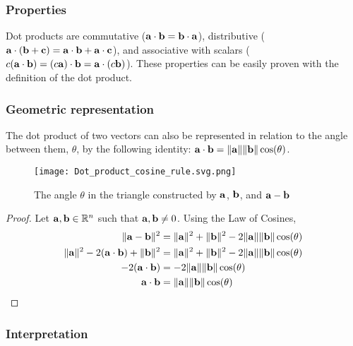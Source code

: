 \documentclass[../main.tex]{subfiles}
\begin{document}
\subsubsection{Properties}

Dot products are commutative ($\mathbf{a} \cdot \mathbf{b} = \mathbf{b} \cdot \mathbf{a}$),
distributive ($\mathbf{a} \cdot (\mathbf{b} + \mathbf{c}) = \mathbf{a} \cdot \mathbf{b} + \mathbf{a} \cdot \mathbf{c}$),
and associative with scalars ($c(\mathbf{a} \cdot \mathbf{b}) = (c\mathbf{a}) \cdot \mathbf{b} = \mathbf{a} \cdot (c\mathbf{b})$).
These properties can be easily proven with the definition of the dot product.

\subsubsection{Geometric representation}

The dot product of two vectors can also
be represented in relation to the angle between them, $\theta$, by
the following identity: $\mathbf{a} \cdot \mathbf{b} = \|\mathbf{a}\| \|\mathbf{b}\| \cos (\theta)$.

\begin{figure}[H]
	\centering
	\texttt{[image: Dot\_product\_cosine\_rule.svg.png]}
	\caption{The angle $\theta$ in the triangle constructed
		by $\mathbf{a}$, $\mathbf{b}$, and $\mathbf{a} - \mathbf{b}$}
\end{figure}

\begin{proof}
	Let $\mathbf{a}, \mathbf{b} \in \mathbb{R}^n$ such that $\mathbf{a}, \mathbf{b} \neq 0$. Using the Law of Cosines,
	\begin{align*}
		\|\mathbf{a}-\mathbf{b}\|^2                                    & = \|\mathbf{a}\|^2 + \|\mathbf{b}\|^2 - 2\|\mathbf{a}\| \|\mathbf{b}\| \cos (\theta) \\
		\|\mathbf{a}\|^2 - 2(\mathbf{a}\cdot\mathbf{b}) + \|\mathbf{b}\|^2 & = \|\mathbf{a}\|^2+\|\mathbf{b}\|^2-2\|\mathbf{a}\|\|\mathbf{b}\|\cos (\theta)       \\
		-2(\mathbf{a}\cdot\mathbf{b})                                  & =-2\|\mathbf{a}\|\|\mathbf{b}\|\cos (\theta)                                     \\
		\mathbf{a}\cdot\mathbf{b}                                      & =\|\mathbf{a}\|\|\mathbf{b}\|\cos (\theta)                                       \\
	\end{align*}
\end{proof}

\subsubsection{Interpretation}
\end{document}
